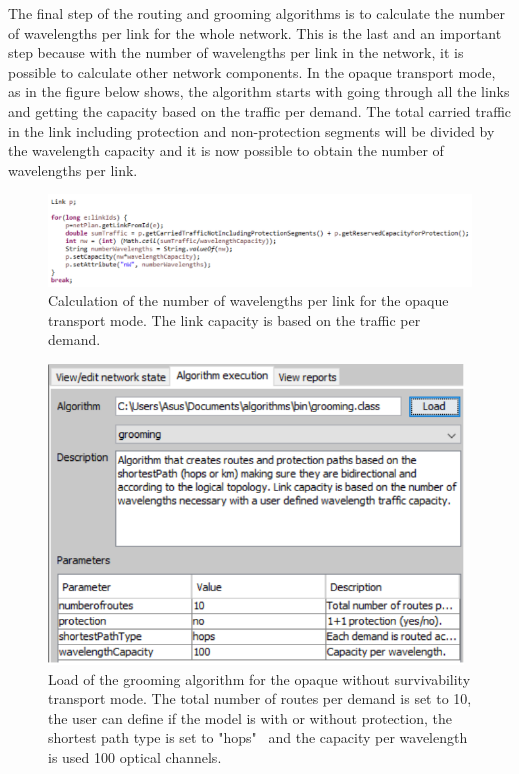 \vspace{11pt}
The final step of the routing and grooming algorithms is to calculate the number of wavelengths per link for the whole network. This is the last and an important step because with the number of wavelengths per link in the network, it is possible to calculate other network components. In the opaque transport mode, as in the figure below shows, the algorithm starts with going through all the links and getting the capacity based on the traffic per demand. The total carried traffic in the link including protection and non-protection segments will be divided by the wavelength capacity and it is now possible to obtain the number of wavelengths per link.

\begin{figure}[H]
\centering
\includegraphics[width=16cm]{sdf/heuristic/opaque_survivability/figures/grooming_opaque_surv2}
\caption{Calculation of the number of wavelengths per link for the opaque transport mode. The link capacity is based on the traffic per demand.}
\label{grooming_opaque_surv2}
\end{figure}

\begin{figure}[H]
\centering
\includegraphics[width=11cm]{sdf/heuristic/opaque_survivability/figures/grooming_opaque_surv3}
\caption{Load of the grooming algorithm for the opaque without survivability transport mode. The total number of routes per demand is set to 10, the user can define if the model is with or without protection, the shortest path type is set to "hops" \ and the capacity per wavelength is used 100 optical channels.}
\label{grooming_opaque_surv3}
\end{figure}

